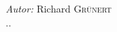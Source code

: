 \documentclass[12pt]{article}
\begin{document}
\begin{titlepage}


\emph{Autor:} Richard {\color{hsblue}\textsc{Grünert}}\\
{\large {\the\day.\the\month.\the\year}}\\






\vfill %

\end{titlepage}
\end{document}

